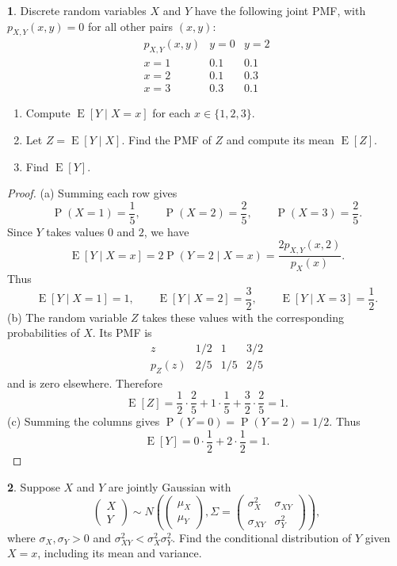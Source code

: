 \documentclass[11pt]{article}
\renewcommand\P{\operatorname{P}}
\newcommand\E{\operatorname{E}}
\theoremstyle{definition}
\newtheorem{problem}{}
\theoremstyle{remark}
\newenvironment{solution}{%
  \renewcommand{\proofname}{Solution}\begin{proof}%
}{\end{proof}}
\begin{document}
\begin{problem}
Discrete random variables $X$ and $Y$ have the following joint PMF, with
$p_{X,Y}(x,y)=0$ for all other pairs $(x,y)$:
\[
  \begin{array}{c|cc}
    p_{X,Y}(x,y) & y=0 & y=2 \\ \hline
    x=1 & 0.1 & 0.1 \\
    x=2 & 0.1 & 0.3 \\
    x=3 & 0.3 & 0.1
  \end{array}
\]
\begin{enumerate}[label=(\alph*)]
  \item Compute $\E[Y\mid X=x]$ for each $x\in\{1,2,3\}$.
  \item Let $Z=\E[Y\mid X]$. Find the PMF of $Z$ and compute its mean
    $\E[Z]$.
  \item Find $\E[Y]$.
\end{enumerate}
\end{problem}

\begin{solution}
(a) Summing each row gives
\[
  \P(X=1)=\frac15,\qquad \P(X=2)=\frac25,\qquad \P(X=3)=\frac25.
\]
Since $Y$ takes values $0$ and $2$, we have
\[
  \E[Y\mid X=x]=2\P(Y=2\mid X=x)
  =\frac{2p_{X,Y}(x,2)}{p_X(x)}.
\]
Thus
\[
  \E[Y\mid X=1]=1,\qquad
  \E[Y\mid X=2]=\frac32,\qquad
  \E[Y\mid X=3]=\frac12.
\]
(b) The random variable $Z$ takes these values with the corresponding
probabilities of $X$. Its PMF is
\[
  \begin{array}{c|ccc}
    z & 1/2 & 1 & 3/2 \\ \hline
    p_Z(z) & 2/5 & 1/5 & 2/5
  \end{array}
\]
and is zero elsewhere. Therefore
\[
  \E[Z]=\frac12\cdot\frac25+1\cdot\frac15+\frac32\cdot\frac25=1.
\]
(c) Summing the columns gives $\P(Y=0)=\P(Y=2)=1/2$. Thus
\[
  \E[Y]=0\cdot\frac12+2\cdot\frac12=1.
\]
\end{solution}

\clearpage


\begin{problem}
Suppose $X$ and $Y$ are jointly Gaussian with
\[
  \begin{pmatrix}X\\Y\end{pmatrix}
  \sim N\!\left(
    \begin{pmatrix}\mu_X\\\mu_Y\end{pmatrix},
    \Sigma=\begin{pmatrix}
      \sigma_X^2 & \sigma_{XY}\\
      \sigma_{XY} & \sigma_Y^2
    \end{pmatrix}
  \right),
\]
where $\sigma_X,\sigma_Y>0$ and
$\sigma_{XY}^2<\sigma_X^2\sigma_Y^2$.
Find the conditional distribution of $Y$ given $X=x$, including its mean
and variance.
\end{problem}
\end{document}
